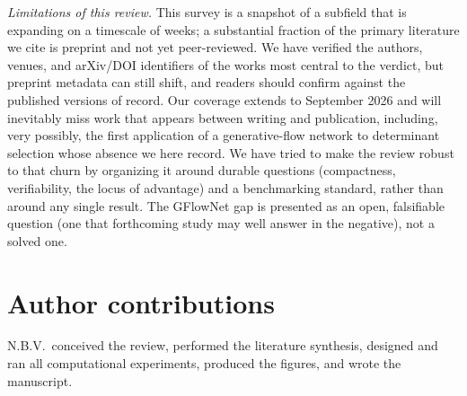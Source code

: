 \documentclass[onecolumn,a4paper]{quantumarticle}
\begin{document}
\emph{Limitations of this review.} This survey is a snapshot of a subfield that is expanding on a timescale of weeks; a substantial fraction of the primary literature we cite is preprint and not yet peer-reviewed. We have verified the authors, venues, and arXiv/DOI identifiers of the works most central to the verdict, but preprint metadata can still shift, and readers should confirm against the published versions of record. Our coverage extends to September 2026 and will inevitably miss work that appears between writing and publication, including, very possibly, the first application of a generative-flow network to determinant selection whose absence we here record. We have tried to make the review robust to that churn by organizing it around durable questions (compactness, verifiability, the locus of advantage) and a benchmarking standard, rather than around any single result. The GFlowNet gap is presented as an open, falsifiable question (one that forthcoming study may well answer in the negative), not a solved one.


\section*{Author contributions}
\small
N.B.V.\ conceived the review, performed the literature synthesis, designed and ran all computational
experiments, produced the figures, and wrote the manuscript.
\end{document}
